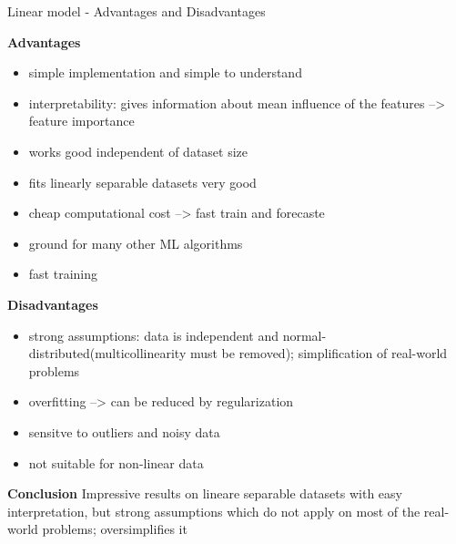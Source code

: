 \documentclass[11pt,compress,t,notes=noshow, xcolor=table]{beamer}
\begin{document}
\begin{frame}{Linear model - Advantages and Disadvantages}

\textbf{Advantages}
\begin{itemize}
\item simple implementation and simple to understand
\item interpretability: gives information about mean influence of the features --> feature importance
\item works good independent of dataset size
\item fits linearly separable datasets very good
\item cheap computational cost --> fast train and forecaste
\item ground for many other ML algorithms
\item fast training
\end{itemize}


\textbf{Disadvantages}
\begin{itemize}
\item strong assumptions: data is independent and normal-distributed(multicollinearity must be removed); simplification of real-world problems
\item overfitting --> can be reduced by regularization
\item sensitve to outliers and noisy data 
\item not suitable for non-linear data
\end{itemize}

\textbf{Conclusion}
Impressive results on lineare separable datasets with easy interpretation, but strong assumptions which do not apply on most of the real-world problems; oversimplifies it

\end{frame}






\end{document}
